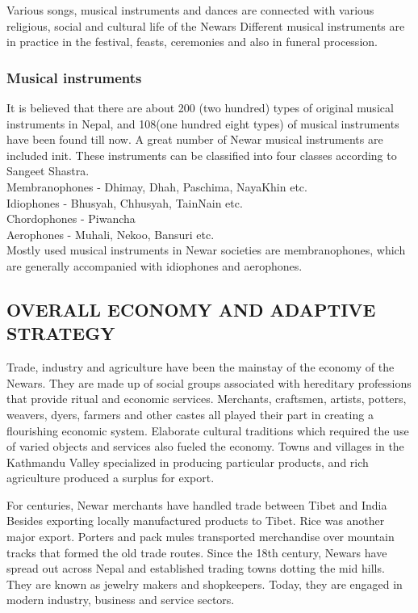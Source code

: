 \documentclass[a4paper,13pt, margin=0.9in]{article}
\begin{document}
\begin{flushleft}
	Various songs, musical instruments and dances are connected with various religious, social and cultural life of the Newars Different musical instruments are in practice in the festival, feasts, ceremonies and also in funeral procession.

	\subsubsection{Musical instruments}

	It is believed that there are about 200 (two hundred) types of original musical instruments in Nepal, and 108(one hundred eight types) of musical instruments have been found till now. A great number of Newar musical instruments are included init. These instruments can be classified into four classes according to Sangeet Shastra.\\

	Membranophones - Dhimay, Dhah, Paschima, NayaKhin etc.\\
	Idiophones - Bhusyah, Chhusyah, TainNain etc.\\
	Chordophones - Piwancha\\
	Aerophones - Muhali, Nekoo, Bansuri etc.\\

	Mostly used musical instruments in Newar societies are membranophones, which are generally accompanied with idiophones and aerophones.




	\newpage
	\subsection{OVERALL ECONOMY AND ADAPTIVE STRATEGY}
	Trade, industry and agriculture have been the mainstay of the economy of the Newars. They are made up of social groups associated with hereditary professions that provide ritual and economic services. Merchants, craftsmen, artists, potters, weavers, dyers, farmers and other castes all played their part in creating a flourishing economic system. Elaborate cultural traditions which required the use of varied objects and services also fueled the economy. Towns and villages in the Kathmandu Valley specialized in producing particular products, and rich agriculture produced a surplus for export.

	For centuries, Newar merchants have handled trade between Tibet and India Besides exporting locally manufactured products to Tibet. Rice was another major export. Porters and pack mules transported merchandise over mountain tracks that formed the old trade routes. Since the 18th century, Newars have spread out across Nepal and established trading towns dotting the mid hills. They are known as jewelry makers and shopkeepers. Today, they are engaged in modern industry, business and service sectors.


\end{flushleft}
\end{document}
